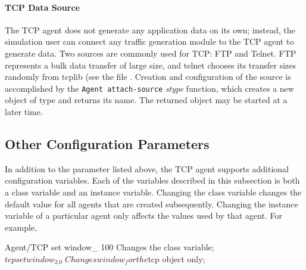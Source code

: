 \paragraph{TCP Data Source}
The TCP agent does not generate any application data on its own;
instead, the simulation user can connect any traffic generation
module to the TCP agent to generate data.
Two sources are commonly used for TCP: FTP and Telnet.
FTP represents a bulk data transfer of large size, and telnet chooses
its transfer sizes randomly from tcplib (see the file
.
Creation and configuration of the source
is accomplished by the {\tt Agent attach-source} {\em stype} function,
which creates a new object of type  and
returns its name.
The returned object may be started at a later time.

\subsection{Other Configuration Parameters}

In addition to the  parameter listed above,
the TCP agent supports additional configuration variables.
Each of the variables described in this subsection is
both a class variable and an instance variable.
Changing the class variable changes the default value
for all agents that are created subsequently.
Changing the instance variable of a particular agent
only affects the values used by that agent.
For example,
\begin{program}
  Agent/TCP set window_ 100     \; Changes the class variable;
  $tcp set window_ 2.0          \; Changes window_ for the $tcp object only;
\end{program}


